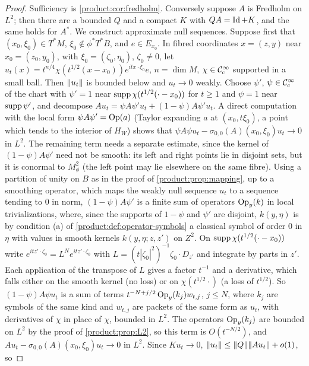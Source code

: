 \begin{proof}
Sufficiency is \cref{product:cor:fredholm}. Conversely suppose $A$ is Fredholm on
$L^2$; then there are a bounded $Q$ and a compact $K$ with $QA=\operatorname{Id}+K$, and the
same holds for $A^*$. We construct approximate null sequences.
Suppose first that $(x_0,\xi_0)\in T^*M$, $\xi_0\notin\phi^*T^*B$, and $e\in E_{x_0}$.
In fibred coordinates $x=(z,y)$ near $x_0=(z_0,y_0)$, with $\xi_0=(\zeta_0,\eta_0)$,
$\zeta_0\ne0$, let
$u_t(x)=t^{n/4}\chi(t^{1/2}(x-x_0))e^{itx\cdot\xi_0}e$, $n=\dim M$, $\chi\in\mathcal{C}^\infty_{\mathrm{c}}$
supported in a small ball. Then $\lVert u_t\rVert$ is bounded below and $u_t\to0$
weakly. Choose $\psi'$, $\psi\in\mathcal{C}^\infty_{\mathrm{c}}$ of the chart with $\psi'=1$ near
$\operatorname{supp}\chi(t^{1/2}(\cdot-x_0))$ for $t\ge1$ and $\psi=1$ near $\operatorname{supp}\psi'$, and
decompose $Au_t=\psi A\psi'u_t+(1-\psi)A\psi'u_t$. A direct computation with the
local form $\psi A\psi'=\operatorname{Op}(a)$ (Taylor expanding $a$ at $(x_0,t\xi_0)$, a point which
tends to the interior of $H_W$) shows that
$\psi A\psi u_t-\sigma_{0,0}(A)(x_0,\xi_0)u_t\to0$ in $L^2$. The remaining term
needs a separate estimate, since the kernel of $(1-\psi)A\psi'$ need not be smooth:
its left and right points lie in disjoint sets, but it is conormal to $M^2_\phi$
(the left point may lie elsewhere on the same fibre). Using a partition of unity
on $B$ as in the proof of \cref{product:prop:mapping}, up to a smoothing operator,
which maps the weakly null sequence $u_t$ to a sequence tending to $0$ in norm,
$(1-\psi)A\psi'$ is a finite sum of operators $\operatorname{Op}_y(k)$ in local
trivializations, where, since the supports of $1-\psi$ and $\psi'$ are disjoint,
$k(y,\eta)$ is by condition (a) of \cref{product:def:operator-symbols} a classical
symbol of order $0$ in $\eta$ with values in smooth kernels $k(y,\eta;z,z')$ on
$Z^2$. On
$\operatorname{supp}\chi(t^{1/2}(\cdot-x_0))$ write $e^{itz'\cdot\zeta_0}=
L^Ne^{itz'\cdot\zeta_0}$ with $L=(t|\zeta_0|^2)^{-1}\zeta_0\cdot D_{z'}$ and
integrate by parts in $z'$. Each application of the transpose of $L$ gives a factor
$t^{-1}$ and a derivative, which falls either on the smooth kernel (no loss) or on
$\chi(t^{1/2}\cdot)$ (a loss of $t^{1/2}$). So $(1-\psi)A\psi u_t$ is a sum of terms
$t^{-N+j/2}\operatorname{Op}_y(k_{j})w_{t,j}$, $j\le N$, where $k_j$ are symbols of the same
kind and $w_{t,j}$ are packets of the same form as $u_t$, with derivatives of
$\chi$ in place of $\chi$, bounded in $L^2$. The operators $\operatorname{Op}_y(k_j)$ are bounded
on $L^2$ by the proof of \cref{product:prop:L2}, so this term is $O(t^{-N/2})$,
and $Au_t-\sigma_{0,0}(A)(x_0,\xi_0)u_t\to0$ in $L^2$. Since $Ku_t\to0$,
$\lVert u_t\rVert\le\lVert Q\rVert\lVert Au_t\rVert+o(1)$, so

\end{proof}
